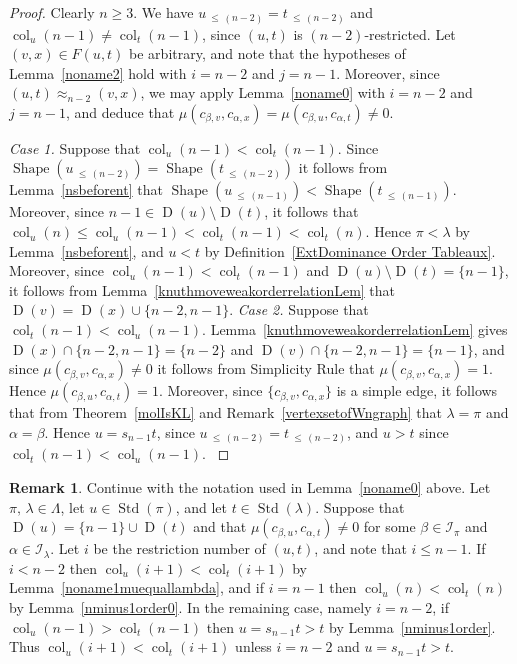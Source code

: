 \documentclass[10pt]{amsart}
\theoremstyle{definition}
\newtheorem{rema}[theo]{Remark}
\newenvironment{Case}[1]{\smallskip\noindent\emph{Case #1}\endgraf
 \nobreak\noindent\ignorespaces}{\endgraf\smallskip}
\DeclareMathOperator{\col}{col}
\newcommand{\Lessthan}[2]{#1\,{_{\leqslant\,#2}}}
\DeclareMathOperator{\STD}{Std}
\DeclareMathOperator{\shape}{Shape}
\DeclareMathOperator{\D}{D}
\begin{document}
\begin{proof}
Clearly $n\geqslant 3$. We have $\Lessthan u{(n-2)} = \Lessthan t{(n-2)}$
and $\col_u(n-1) \neq \col_t(n-1)$, since $(u,t)$ is $(n-2)$-restricted.
Let $(v,x)\in F(u,t)$ be arbitrary, and note that the hypotheses
of Lemma~\ref{noname2} hold with $i=n-2$ and $j=n-1$. Moreover, since
$(u,t)\approx_{n-2}(v,x)$, we may apply Lemma~\ref{noname0} with $i=n-2$ and
$j=n-1$, and deduce that
$\mu(c_{\beta,v},c_{\alpha,x})=\mu(c_{\beta,u},c_{\alpha,t}) \neq 0$.

\begin{Case}{1.}Suppose that $\col_u(n-1)<\col_t(n-1)$. Since
$\shape(\Lessthan u{(n-2)})=\shape(\Lessthan t{(n-2)})$
it follows from Lemma~\ref{nsbeforent} that
$\shape(\Lessthan u{(n-1)})<\shape(\Lessthan t{(n-1)})$. Moreover, since
$n-1\in\D(u)\setminus\D(t)$, it follows that
$\col_u(n)\leqslant\col_u(n-1)<\col_t(n-1)<\col_t(n)$. Hence $\pi<\lambda$
by Lemma~\ref{nsbeforent}, and $u<t$ by Definition~\ref{ExtDominance Order Tableaux}.
Moreover, since $\col_u(n-1)<\col_t(n-1)$ and $\D(u)\setminus\D(t)=\{n-1\}$, it
follows from Lemma~\ref{knuthmoveweakorderrelationLem} that
$\D(v)=\D(x)\cup\{n-2,n-1\}$.
\end{Case}
\begin{Case}{2.}Suppose that $\col_t(n-1)<\col_u(n-1)$. Lemma~\ref{knuthmoveweakorderrelationLem}
gives $\D(x)\cap\{n-2,n-1\}=\{n-2\}$ and $\D(v)\cap\{n-2,n-1\}=\{n-1\}$, and since
$\mu(c_{\beta,v},c_{\alpha,x})\ne0$ it follows from
Simplicity Rule
that $\mu(c_{\beta,v},c_{\alpha,x})=1$.
Hence $\mu(c_{\beta,u},c_{\alpha,t})=1$. Moreover, since $\{c_{\beta,v},c_{\alpha,x}\}$ is a
simple edge, it follows that from Theorem~\ref{molIsKL} and Remark~\ref{vertexsetofWngraph}
that $\lambda=\pi$ and $\alpha=\beta$. Hence $u=s_{n-1}t$, since
$\Lessthan u{(n-2)} = \Lessthan t{(n-2)}$, and $u>t$ since $\col_t(n-1)<\col_u(n-1)$.
\qedhere
\end{Case}
\end{proof}

\begin{rema}\label{nminus1iplusonest}
Continue with the notation used in Lemma~\ref{noname0} above. Let
$\pi,\,\lambda\in\Lambda$, let $u\in\STD(\pi)$, and let $t\in\STD(\lambda)$.
Suppose that $\D(u) = \{n-1\} \cup \D(t)$ and that $\mu(c_{\beta,u},c_{\alpha,t}) \neq 0$
for some $\beta\in\mathcal{I}_{\pi}$ and $\alpha\in\mathcal{I}_{\lambda}$. Let
$i$ be the restriction number of $(u,t)$, and note that $i\leqslant n-1$. If $i<n-2$ then
$\col_u(i+1)<\col_t(i+1)$ by Lemma~\ref{noname1muequallambda}, and if $i=n-1$ then
$\col_u(n)<\col_t(n)$ by Lemma~\ref{nminus1order0}. In the remaining case, namely
$i=n-2$, if $\col_u(n-1)>\col_t(n-1)$ then $u=s_{n-1}t>t$ by
Lemma~\ref{nminus1order}. Thus $\col_u(i+1)<\col_t(i+1)$
unless $i=n-2$ and $u=s_{n-1}t>t$.
\end{rema}
\end{document}

